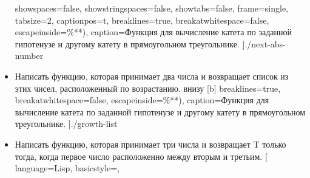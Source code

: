 \begin{itemize}
		showspaces=false,            %
		showstringspaces=false,      %
		showtabs=false,             %
		frame=single,              %
		tabsize=2,                 %
		captionpos=t,              %
		breaklines=true,           %
		breakatwhitespace=false, %
		escapeinside={\%*}{*)},  %
		caption=Функция для вычисление катета по заданной гипотенузе и другому катету в прямоугольном треугольнике.
		]{./next-abs-number}
	\item Написать функцию, которая принимает два числа и возвращает список из этих чисел, расположенный по возрастанию.
	 внизу [b] 
		breaklines=true,           %
		breakatwhitespace=false, %
		escapeinside={\%*}{*)},  %
		caption=Функция для вычисление катета по заданной гипотенузе и другому катету в прямоугольном треугольнике.
		]{./growth-list}
	\item Написать функцию, которая принимает три числа и возвращает T только тогда, когда первое число расположенно между вторым и третьим.
	[
		language=Lisp,                 %
		basicstyle=\small\sffamily, %

\end{itemize}
